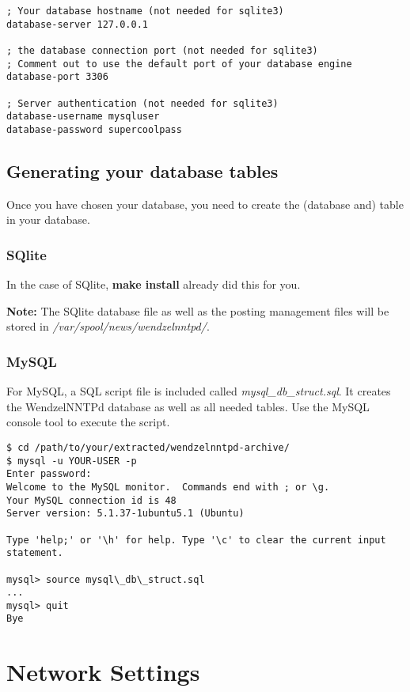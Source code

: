 \begin{verbatim}
; Your database hostname (not needed for sqlite3)
database-server 127.0.0.1

; the database connection port (not needed for sqlite3)
; Comment out to use the default port of your database engine
database-port 3306

; Server authentication (not needed for sqlite3)
database-username mysqluser
database-password supercoolpass
\end{verbatim}

\subsection{Generating your database tables}

Once you have chosen your database, you need to create the (database and) table in your database.

\subsubsection{SQlite}

In the case of SQlite, {\bf make install} already did this for you.

{\bf Note:} The SQlite database file as well as the posting management files will be stored in {\it /var/spool/news/wendzelnntpd/}.

\subsubsection{MySQL}

For MySQL, a SQL script file is included called {\it mysql\_db\_struct.sql}. It creates the WendzelNNTPd database as well as all needed tables. Use the MySQL console tool to execute the script.

\begin{verbatim}
$ cd /path/to/your/extracted/wendzelnntpd-archive/
$ mysql -u YOUR-USER -p
Enter password: 
Welcome to the MySQL monitor.  Commands end with ; or \g.
Your MySQL connection id is 48
Server version: 5.1.37-1ubuntu5.1 (Ubuntu)

Type 'help;' or '\h' for help. Type '\c' to clear the current input statement.

mysql> source mysql\_db\_struct.sql
...
mysql> quit
Bye
\end{verbatim}

\section{Network Settings}


